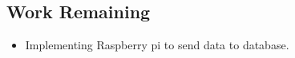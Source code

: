\documentclass[a4paper,12pt]{report}
\begin{document}
\subsection{Work Remaining}
  \begin{itemize}
\item Implementing Raspberry pi to send data to database.
\end{itemize}
  \pagebreak
{}


\end{document}
